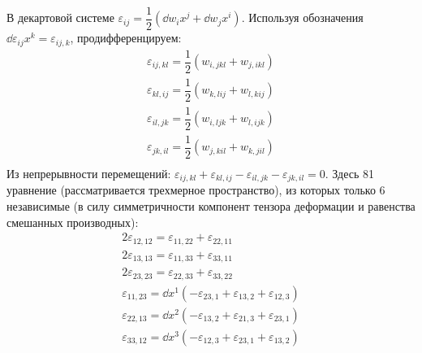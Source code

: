 В декартовой системе $\varepsilon_{ij} = \dfrac{1}{2}\left(\dd{w_i}{x^j}+ \dd{w_j}{x^i}\right)$. Используя обозначения $\dd{\varepsilon_{ij}}{x^k} = \varepsilon_{ij, k}$, продифференцируем:
\begin{gather*}
\varepsilon_{ij, kl} = \dfrac{1}{2}(w_{i,jkl} + w_{j,ikl}) \\
\varepsilon_{kl, ij} = \dfrac{1}{2}(w_{k,lij} + w_{l,kij}) \\
\varepsilon_{il, jk} = \dfrac{1}{2}(w_{i,ljk} + w_{l,ijk}) \\
\varepsilon_{jk, il} = \dfrac{1}{2}(w_{j,kil} + w_{k,jil}) \\
\end{gather*}
Из непрерывности перемещений: $\varepsilon_{ij, kl} + \varepsilon_{kl, ij} - \varepsilon_{il, jk} - \varepsilon_{jk, il} = 0$. Здесь 81 уравнение (рассматривается трехмерное пространство), из которых только 6 независимые (в силу симметричности компонент тензора деформации и равенства смешанных производных):
\begin{gather*}
2\varepsilon_{12, 12} = \varepsilon_{11, 22} + \varepsilon_{22, 11} \\
2\varepsilon_{13, 13} = \varepsilon_{11, 33} + \varepsilon_{33, 11} \\
2\varepsilon_{23, 23} = \varepsilon_{22, 33} + \varepsilon_{33, 22} \\
\varepsilon_{11, 23} = \dd{}{x^1}(-\varepsilon_{23, 1} + \varepsilon_{13, 2} + \varepsilon_{12, 3}) \\
\varepsilon_{22, 13} = \dd{}{x^2}(-\varepsilon_{13, 2} + \varepsilon_{21, 3} + \varepsilon_{23, 1}) \\
\varepsilon_{33, 12} = \dd{}{x^3}(-\varepsilon_{12, 3} + \varepsilon_{23, 1} + \varepsilon_{13, 2})
\end{gather*}
